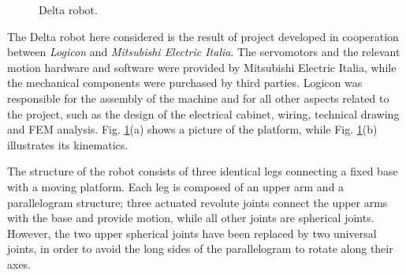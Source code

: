 \documentclass[]{interact}
\theoremstyle{plain}%
\theoremstyle{definition}
\theoremstyle{remark}
\begin{document}
{\begin{figure}
\caption{Delta robot.} \label{Fig:Delta_picture}
\end{figure}
The Delta robot here considered is the result of project developed in cooperation between \emph{Logicon} and \emph{Mitsubishi Electric Italia}. The servomotors and the relevant motion hardware and software were provided by Mitsubishi Electric Italia, while the mechanical components were purchased by third parties. Logicon was responsible for the assembly of the machine and for all other aspects related to the project, such as the design of the electrical cabinet, wiring, technical drawing and FEM analysis. Fig. \ref{Fig:Delta_picture}(a) shows a picture of the platform, while Fig. \ref{Fig:Delta_picture}(b) illustrates its kinematics.

The structure of the robot consists of three identical legs connecting a fixed base with a moving platform. Each leg is composed of an upper arm and a parallelogram structure; three actuated revolute joints connect the upper arms with the base and provide motion, while all other joints are spherical joints. However, the two upper spherical joints have been replaced by two universal joints, in order to avoid the long sides of the parallelogram to rotate along their axes.

}
\end{document}
